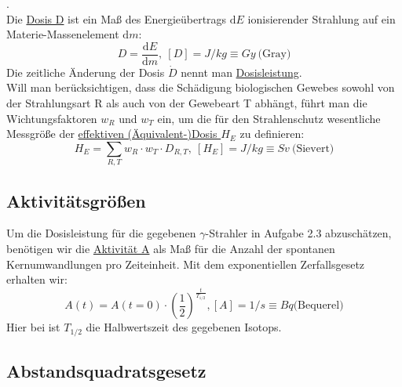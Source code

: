 \begin{definition}[Dosisgrößen].\\
	Die \underline{Dosis D} ist ein Maß des Energieübertrags $\mathrm{d}E$ ionisierender Strahlung 		auf ein Materie-Massenelement $\mathrm{d}m$:
\begin{equation}\label{eq:dosis}
	D = \frac{\mathrm{d}E}{\mathrm{d}m},\ [D] = J/kg \equiv Gy\ \textrm{(Gray)}
\end{equation}
Die zeitliche Änderung der Dosis $\dot{D}$ nennt man \underline{Dosisleistung}.\\
Will man berücksichtigen, dass die Schädigung biologischen Gewebes sowohl von der Strahlungsart R als auch von der Gewebeart T abhängt, führt man die Wichtungsfaktoren $w_R$ und $w_T$ ein, um die für den Strahlenschutz wesentliche Messgröße der \underline{effektiven (Äquivalent-)Dosis $H_E$} zu definieren:
\begin{equation}
	H_E = \sum_{R,T} w_R \cdot w_T \cdot D_{R,T},\ [H_E]=J/kg \equiv Sv\ \textrm{(Sievert)}
\end{equation}
\end{definition}

\subsection{Aktivitätsgrößen}
Um die Dosisleistung für die gegebenen $\gamma$-Strahler in Aufgabe 2.3 abzuschätzen, benötigen wir die \underline{Aktivität A} als Maß für die Anzahl der spontanen Kernumwandlungen pro Zeiteinheit. Mit dem exponentiellen Zerfallsgesetz erhalten wir:
\begin{equation}
	A(t)=A(t=0) \cdot \left(\frac{1}{2}\right)^{\frac{t}{T_{1/2}}}, [A] = 1/s \equiv Bq \textrm{(Bequerel)}
\end{equation}
Hier bei ist $T_{1/2}$ die Halbwertszeit des gegebenen Isotops.

\subsection{Abstandsquadratsgesetz}

